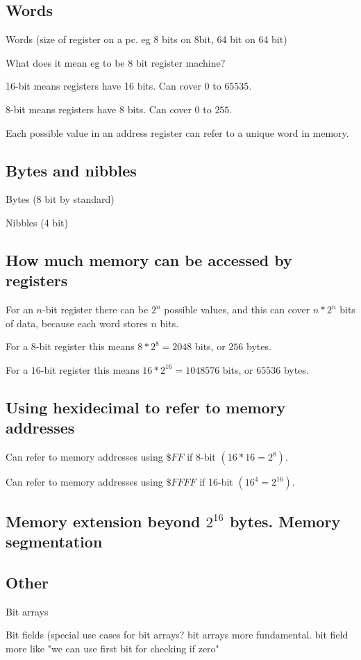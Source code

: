 
\subsection{Words}

Words (size of register on a pc. eg 8 bits on 8bit, 64 bit on 64 bit)

What does it mean eg to be 8 bit register machine?

16-bit means registers have 16 bits. Can cover \(0\) to \(65535\).

8-bit means registers have 8 bits. Can cover \(0\) to \(255\).

Each possible value in an address register can refer to a unique word in memory.

\subsection{Bytes and nibbles}

Bytes (8 bit by standard)

Nibbles (4 bit)

\subsection{How much memory can be accessed by registers}

For an \(n\)-bit register there can be \(2^n\) possible values, and this can cover \(n*2^n\) bits of data, because each word stores \(n\) bits.

For a \(8\)-bit register this means \(8*2^8=2048\) bits, or \(256\) bytes.

For a \(16\)-bit register this means \(16*2^16=1048576\) bits, or \(65536\) bytes.

\subsection{Using hexidecimal to refer to memory addresses}

Can refer to memory addresses using \(\$FF\) if 8-bit \((16*16=2^8)\).

Can refer to memory addresses using \(\$FFFF\) if 16-bit \((16^4=2^16)\).

\subsection{Memory extension beyond \(2^16\) bytes. Memory segmentation}

\subsection{Other}

Bit arrays

Bit fields (special use cases for bit arrays? bit arrays more fundamental. bit field more like "we can use first bit for checking if zero"

